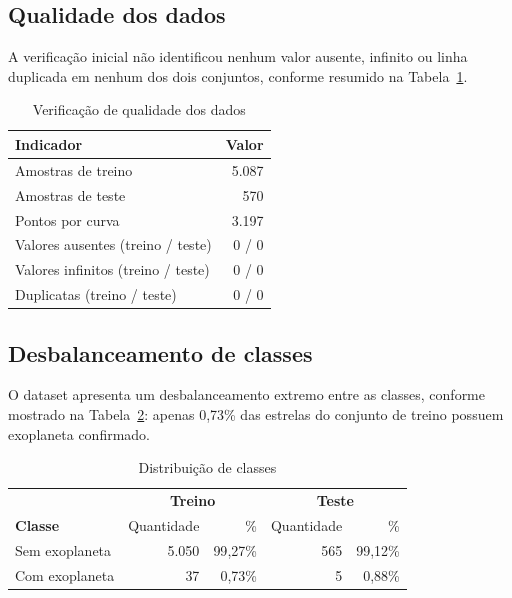 \documentclass[12pt,a4paper]{article}
\begin{document}
\subsection*{Qualidade dos dados}

A verificação inicial não identificou nenhum valor ausente, infinito ou linha duplicada em nenhum dos dois conjuntos, conforme resumido na Tabela~\ref{tab:qualidade}.

\begin{table}[H]
\centering
\caption{Verificação de qualidade dos dados}
\label{tab:qualidade}
\begin{tabular}{lr}
\toprule
\textbf{Indicador} & \textbf{Valor} \\
\midrule
Amostras de treino & 5.087 \\
Amostras de teste & 570 \\
Pontos por curva & 3.197 \\
Valores ausentes (treino / teste) & 0 / 0 \\
Valores infinitos (treino / teste) & 0 / 0 \\
Duplicatas (treino / teste) & 0 / 0 \\
\bottomrule
\end{tabular}
\end{table}

\subsection*{Desbalanceamento de classes}

O dataset apresenta um desbalanceamento extremo entre as classes, conforme mostrado na Tabela~\ref{tab:desbalanceamento}: apenas 0,73\% das estrelas do conjunto de treino possuem exoplaneta confirmado.

\begin{table}[H]
\centering
\caption{Distribuição de classes}
\label{tab:desbalanceamento}
\begin{tabular}{lrrrr}
\toprule
& \multicolumn{2}{c}{\textbf{Treino}} & \multicolumn{2}{c}{\textbf{Teste}} \\
\textbf{Classe} & Quantidade & \% & Quantidade & \% \\
\midrule
Sem exoplaneta & 5.050 & 99{,}27\% & 565 & 99{,}12\% \\
Com exoplaneta & 37 & 0{,}73\% & 5 & 0{,}88\% \\
\bottomrule
\end{tabular}
\end{table}
\end{document}
